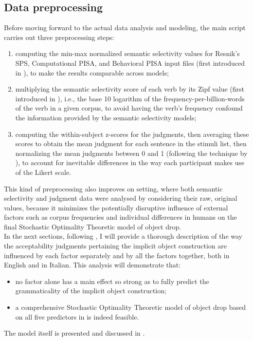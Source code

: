\subsection{Data preprocessing} 

Before moving forward to the actual data analysis and modeling, the main script carries out three preprocessing steps:
\begin{enumerate}
    \item computing the min-max normalized semantic selectivity values for Resnik's SPS, Computational PISA, and Behavioral PISA input files (first introduced in ), to make the results comparable across models;
    \item multiplying the semantic selectivity score of each verb by its Zipf value (first introduced in ), i.e., the base 10 logarithm of the frequency-per-billion-words of the verb in a given corpus, to avoid having the verb's frequency confound the information provided by the semantic selectivity models;
    \item computing the within-subject z-scores for the judgments, then averaging these scores to obtain the mean judgment for each sentence in the stimuli list, then normalizing the mean judgments between 0 and 1 (following the technique by \textcite{KimEtAl2018, KimEtAl2019, KimEtAl2019a}), to account for inevitable differences in the way each participant makes use of the Likert scale.
\end{enumerate}

This kind of preprocessing also improves on  setting, where both semantic selectivity and judgment data were analysed by considering their raw, original values, because it minimizes the potentially disruptive influence of external factors such as corpus frequencies and individual differences in humans on the final Stochastic Optimality Theoretic model of object drop.\\
In the next sections, following \textcite{Medina2007}, I will provide a thorough description of the way the acceptability judgments pertaining the implicit object construction are influenced by each factor separately and by all the factors together, both in English and in Italian. This analysis will demonstrate that:
\begin{itemize}
    \item no factor alone has a main effect so strong as to fully predict the grammaticality of the implicit object construction;
    \item a comprehensive Stochastic Optimality Theoretic model of object drop based on all five predictors in  is indeed feasible.
\end{itemize}
The model itself is presented and discussed in .



